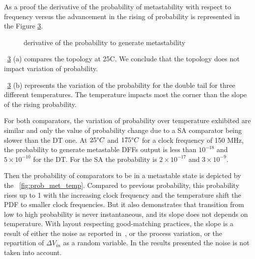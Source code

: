 As a proof the derivative of the probability of metastability  with respect to frequency versus the advancement in the rising of probability is represented in the Figure \ref{fig:slop_deriv_sa_dt_temp}.

\begin{figure}[htp]
 \centering
 \begin{subfigure}[b]{0.48\textwidth}
  
   \label{fig:sa_dtl_slope_temp}
 \end{subfigure}
 \begin{subfigure}[b]{0.48\textwidth}
  
   \label{fig:dtl_slope_temp}
 \end{subfigure}
 \caption{derivative of the probability to generate metastability}
 \label{fig:slop_deriv_sa_dt_temp}
\end{figure}

\figurename~\ref{fig:slop_deriv_sa_dt_temp} (a) compares the topology at 25\degree C. We conclude that the topology does not impact variation of probability. 

\figurename~\ref{fig:slop_deriv_sa_dt_temp} (b) represents the variation of the probability for the double tail for three different temperatures. The temperature impacts most the corner than the slope of the rising probability.

For both comparators, the variation of probability over temperature exhibited are similar and only the value of probability change due to a SA comparator being slower than the DT one. At $25 \degree C$ and $175 \degree C$ for a clock frequency of 150 MHz, the probability to generate metastable DFFs output is less than $10^{-18}$ and $5\times 10^{-10}$ for the DT\@. For the SA the probability is $2\times 10^{-17}$ and $3\times 10^{-9}$.

Then the probability of comparators to be in a metastable state is depicted by the \figurename~\ref{fig:prob_met_temp}. Compared to previous probability, this probability rises up to 1 with the increasing clock frequency and the temperature shift the PDF to smaller clock frequencies. But it also demonstrates that transition from low to high probability is never instantaneous, and its slope does not depends on temperature. With layout respecting good-matching practices, the slope is a result of either the noise as reported in~\cite{metastability_figueiredo_2013}, or the process variation, or the repartition of $\Delta V_{in}$ as a random variable. In the results presented the noise is not taken into account.

